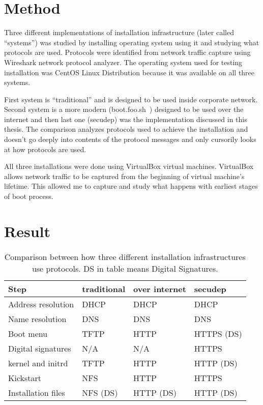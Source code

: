 
\section{Method}

Three different implementations of installation infrastructure (later
called ``systems'') was studied by installing operating system using
it and studying what protocols are used. Protocols were identified
from network traffic capture using Wireshark network protocol
analyzer. The operating system used for testing installation was
CentOS Linux Distribution because it was available on all three
systems.

First system is ``traditional'' and is designed to be used inside
corporate network. Second system is a more modern
(boot.foo.sh~\cite{boot-foo-sh}) designed to be used over the internet
and then last one (secudep) was the implementation discussed in this
thesis. The comparison analyzes protocols used to achieve the
installation and doesn't go deeply into contents of the protocol
messages and only cursorily looks at how protocols are used.

All three installations were done using VirtualBox virtual
machines. VirtualBox allows network traffic to be captured from the
beginning of virtual machine's lifetime. This allowed me to capture
and study what happens with earliest stages of boot process.

\section{Result}

\begin{table}[!ht]
  \def\arraystretch{1.1}%
  \begin{center}
    \begin{tabular}{| l | l | l | l |}
      \hline
      Step               & traditional & over internet & secudep    \\
      \hline
      Address resolution & DHCP        & DHCP          & DHCP       \\
      Name resolution    & DNS         & DNS           & DNS        \\
      Boot menu          & TFTP        & HTTP          & HTTPS (DS) \\
      Digital signatures & N/A         & N/A           & HTTPS      \\
      kernel and initrd  & TFTP        & HTTP          & HTTP (DS)  \\
      Kickstart          & NFS         & HTTP          & HTTPS      \\
      Installation files & NFS (DS)    & HTTP (DS)     & HTTP (DS)  \\
      \hline
    \end{tabular}
    \caption{Comparison between how three different installation
      infrastructures use protocols. DS in table means Digital
      Signatures.\label{tab:comparison_table}}
  \end{center}
\end{table}


